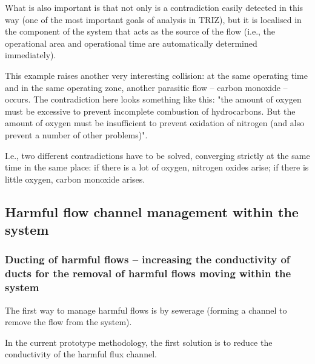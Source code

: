 \documentclass[a4paper,11pt]{article}
\begin{document}
What is also important is that not only is a contradiction easily detected in
this way (one of the most important goals of analysis in TRIZ), but it is
localised in the component of the system that acts as the source of the flow
(i.e., the operational area and operational time are automatically determined
immediately).

This example raises another very interesting collision: at the same operating
time and in the same operating zone, another parasitic flow -- carbon monoxide
-- occurs. The contradiction here looks something like this: "the amount of
oxygen must be excessive to prevent incomplete combustion of hydrocarbons. But
the amount of oxygen must be insufficient to prevent oxidation of nitrogen
(and also prevent a number of other problems)".

I.e., two different contradictions have to be solved, converging strictly at
the same time in the same place: if there is a lot of oxygen, nitrogen oxides
arise; if there is little oxygen, carbon monoxide arises.

\subsection{Harmful flow channel management within the system}

\subsubsection{Ducting of harmful flows -- increasing the conductivity of
  ducts for the removal of harmful flows moving within the system} 

The first way to manage harmful flows is by sewerage (forming a channel to
remove the flow from the system).

In the current prototype methodology, the first solution is to reduce the
conductivity of the harmful flux channel.
\end{document}
